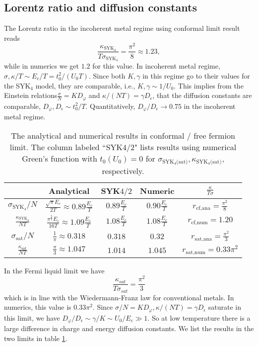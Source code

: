 \documentclass[twocolumn,floatfix,superscriptaddress]{revtex4-1}
\begin{document}
\begin{widetext}
\subsection{Lorentz ratio and diffusion constants}
The Lorentz ratio in the incoherent metal regime using conformal limit result reads
\begin{equation}
\frac{\kappa_{\text{SYK}_4}}{T\sigma_{\text{SYK}_4}}=\frac{\pi^2}{8}\approx1.23 ,
\end{equation}
while in numerics we get $1.2$ for this value. In incoherent metal
regime, $\sigma,\kappa/T\sim E_c/T=t_0^2/(U_0T)$. Since both
$K,\gamma$ in this regime go to their values for the  SYK$_4$
model\cite{maldacena_2016,davidson_2016}, they are comparable, i.e.,
$K,\gamma\sim 1/U_0$.  This implies from the Einstein relations$
\frac{\sigma}{N}=KD_\varphi$ and $\kappa/(NT)=\gamma D_\epsilon$, that
the diffusion constants are comparable, $D_\varphi,D_\epsilon\sim
t_0^2/T$.   Quantitatively, $D_\varphi/D_\epsilon\rightarrow 0.75$ in
the incoherent metal regime.

\begin{table}
\begin{center}
\caption {The analytical and numerical results in conformal / free fermion limit. The column labeled ``SYK$4/2$" lists results using numerical Green's function with $t_0(U_0)=0$ for $\sigma_{\text{SYK$_4$(sat)}},\kappa_{\text{SYK$_4$(sat)}}$, respectively.}
\label{limit_re}
\begin{tabular}{c|ccc|c}
\hline
\hline
 &Analytical&SYK$4/2$ & Numeric & $\frac{\kappa}{T\sigma}$\\
 \hline
 $\sigma_{\text{SYK}_4}/N$ &$\frac{\sqrt \pi E_c}{2T}\approx 0.89\frac{E_c}{T}$ & $0.89\frac{E_c}{T}$ & $0.90 \frac{E_c}{T}$ & $r_{\text{cf,ana}}=\frac{\pi^2}{8}$\\
$ \frac{\kappa_{\text{SYK}_4}}{NT}$ &$\frac{\pi^{\frac{5}{2}}E_c}{16 T}\approx 1.09\frac{E_c}{T}$ & $1.08\frac{E_c}{T}$ & $1.08\frac{E_c}{T}$ & $r_{\text{cf,num}}=1.20$\\
\hline
$\sigma_{\text{sat}}/N$ & $\frac{1}{\pi}\approx 0.318 $ & $0.318$ & $0.32$& $r_{\text{sat,ana}}= \frac{\pi^2}{3}$\\
$\frac{\kappa_{\text{sat}}}{NT}$ &$\frac{\pi}{3}\approx 1.047$ & $1.014$ & $1.045$ & $r_{\text{sat,num}}=0.33\pi^2$\\
\hline
\hline

\end{tabular}
\end{center}
\end{table} 
In the Fermi liquid limit we have
\begin{equation}
\frac{\kappa_{sat}}{T\sigma_{sat}}=\frac{\pi^2}{3}
\end{equation}
which is in line with the Wiedermann-Franz law for conventional
metals. In numerics, this value is $0.33\pi^2$. Since
$\sigma/N=KD_\varphi,\kappa/(NT)=\gamma D_\epsilon$ saturate in this
limit, we have $D_\varphi/D_\epsilon\sim \gamma/K\sim U_0/E_c\gg 1$.
So at low temperature there is a large difference in charge and energy
diffusion constants.  We list the results in the two limits in table \ref{limit_re}.


\end{widetext}
\end{document}
